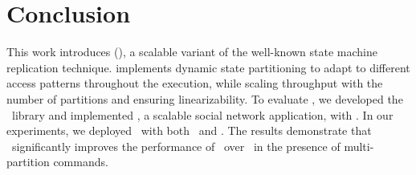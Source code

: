 \section{Conclusion}
\label{sec:conclusion}

This work introduces \dssmrlong{} (\dssmr), a scalable variant of the well-known state machine replication technique. 
\dssmr{} implements dynamic state partitioning to adapt to different access patterns throughout the execution, while scaling throughput with the number of partitions and ensuring linearizability.
To evaluate \dssmr{}, we developed the \libname\ library and implemented \appname{}, a scalable social network application, with \libname{}.
In our experiments, we deployed \appname\ with both \dssmr\ and \ssmr{}.
The results demonstrate that \dssmr\ significantly improves the performance of \appname\ over \ssmr\ in the presence of multi-partition commands.

